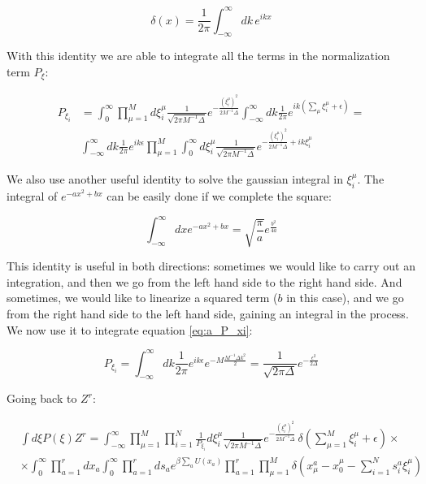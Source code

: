 \begin{equation}
  \label{eq:a_27}
  \delta(x) = \frac{1}{2\pi} \int_{-\infty}^\infty dk\, e^{i k x}
\end{equation}

With this identity we are able to integrate all the terms in the normalization term $P_\xi$:

\begin{align}
  \label{eq:a_P_xi}
  P_{\xi_i} & = \int_0^\infty \prod_{\mu=1}^M d\xi_i^\mu
  \frac{1}{\sqrt{2\pi M^{-1}\Delta}}e^{-\frac{(\xi_i^\mu)^2}{2 M^{-1}\Delta}}
  \int_{-\infty}^\infty dk \frac{1}{2\pi} e^{i k (\sum_\mu \xi_i^\mu + \epsilon)} =
  \\ & \int_{-\infty}^\infty dk \frac{1}{2\pi} e^{ik\epsilon} \prod_{\mu=1}^M
  \int_0^\infty d\xi_i^\mu \frac{1}{\sqrt{2\pi
      M^{-1}\Delta}}e^{-\frac{(\xi_i^\mu)^2}{2 M^{-1}\Delta} + i k \xi_i^\mu}
\end{align}

We also use another useful identity to solve the gaussian integral in $\xi_i^\mu$. The integral of $e^{-a x^2 + b x}$ can be easily done if we complete the square:

\begin{equation}
  \label{eq:a_gaussian_integral}
  \int_{-\infty}^\infty dx e^{-ax^2 + bx} = \sqrt{\frac{\pi}{a}} e^{\frac{b^2}{4a}}
\end{equation}

This identity is useful in both directions: sometimes we would like to carry out an integration, and then we go from the left hand side to the right hand side. And sometimes, we would like to linearize a squared term ($b$ in this case), and we go from the right hand side to the left hand side, gaining an integral in the process. We now use it to integrate equation \eqref{eq:a_P_xi}:

\begin{equation}
  \label{eq:a_29}
  P_{\xi_i} = \int_{-\infty}^\infty dk \frac{1}{2\pi} e^{ik\epsilon} 
  e^{-M\frac{M^{-1}\Delta k^2}{2}} = \frac{1}{\sqrt{2\pi\Delta}} e^{-\frac{\epsilon^2}{2\Delta}}
\end{equation}

Going back to $Z^r$:

\begin{align}
    \label{eq:a_30}
    & \int d\xi P(\xi)
  Z^r = \int_{-\infty}^\infty \prod_{\mu=1}^M \prod_{i=1}^N
      \frac{1}{P_{\xi_i}} d\xi_i^\mu \frac{1}{\sqrt{2\pi
      M^{-1}\Delta}}e^{-\frac{(\xi_i^\mu)^2}{2 M^{-1}\Delta}}\, 
    \delta\left(\sum_{\mu=1}^M \xi_i^\mu + \epsilon\right) \times \\ &
    \times \int_0^\infty \prod_{a=1}^r d x_a \int_0^\infty
    \prod_{a=1}^r d s_a e^{\beta \sum_a U(x_a)} \prod_{a=1}^r
    \prod_{\mu=1}^M \delta \left(x_\mu^a - x_0^\mu - \sum_{i=1}^N s_i^a
      \xi_i^\mu \right) \nonumber
\end{align}


